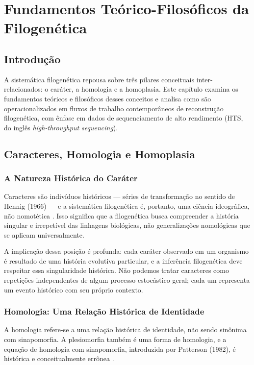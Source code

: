 
\chapter{Fundamentos Teórico-Filosóficos da Filogenética}

\section{Introdução}

A sistemática filogenética repousa sobre três pilares conceituais inter-relacionados: o caráter, a homologia e a homoplasia. Este capítulo examina os fundamentos teóricos e filosóficos desses conceitos e analisa como são operacionalizados em fluxos de trabalho contemporâneos de reconstrução filogenética, com ênfase em dados de sequenciamento de alto rendimento (HTS, do inglês \textit{high-throughput sequencing}).

\section{Caracteres, Homologia e Homoplasia}

\subsection{A Natureza Histórica do Caráter}

Caracteres são indivíduos históricos --- séries de transformação no sentido de Hennig (1966) --- e a sistemática filogenética é, portanto, uma ciência ideográfica, não nomotética \parencite{grant2004}. Isso significa que a filogenética busca compreender a história singular e irrepetível das linhagens biológicas, não generalizações nomológicas que se aplicam universalmente.

A implicação dessa posição é profunda: cada caráter observado em um organismo é resultado de uma história evolutiva particular, e a inferência filogenética deve respeitar essa singularidade histórica. Não podemos tratar caracteres como repetições independentes de algum processo estocástico geral; cada um representa um evento histórico com seu próprio contexto.

\subsection{Homologia: Uma Relação Histórica de Identidade}

A homologia refere-se a uma relação histórica de identidade, não sendo sinônima com sinapomorfia. A plesiomorfia também é uma forma de homologia, e a equação de homologia com sinapomorfia, introduzida por Patterson (1982), é histórica e conceitualmente errônea \parencite{nixon2011}.

